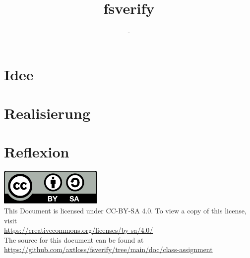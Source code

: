 \documentclass[12pt,a4paper]{article}
\title{fsverify}
\author{-}
\begin{document}

\clearpage
\newpage
\tableofcontents
{}
\newpage
\section{Idee}

\section{Realisierung}

\section{Reflexion}

\bigbreak
\newpage
\includegraphics{by-sa.pdf}\\
This Document is licensed under CC-BY-SA 4.0. To view a copy of this license, visit\\
\url{https://creativecommons.org/licenses/by-sa/4.0/}\\
The source for this document can be found at\\ \url{https://github.com/axtloss/fsverify/tree/main/doc/class-assignment}
\end{document}

